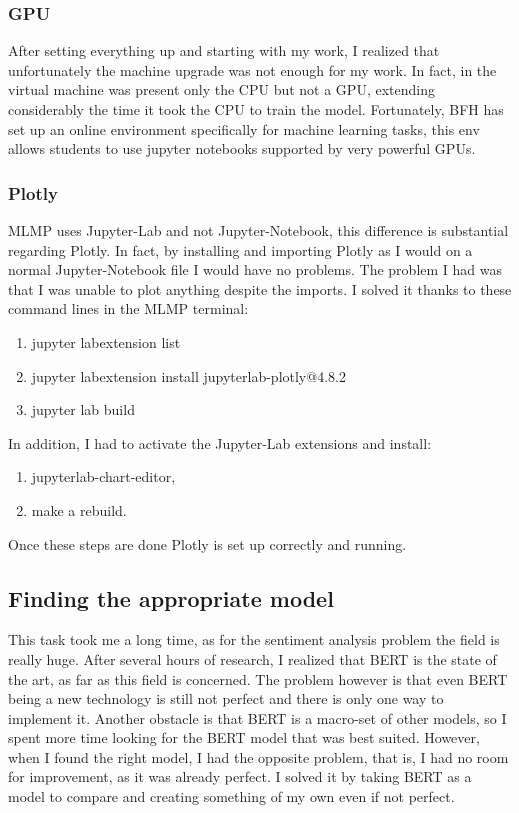\subsubsection{GPU}
After setting everything up and starting with my work, I realized that unfortunately the machine upgrade was not enough for my work.
In fact, in the virtual machine was present only the CPU but not a GPU, extending considerably the time it took the CPU to train the model.
Fortunately, BFH has set up an online environment specifically for machine learning tasks, this env allows students to use jupyter notebooks supported by very powerful GPUs.

\subsubsection{Plotly}
\gls{MLMP} uses Jupyter-Lab and not Jupyter-Notebook, this difference is substantial regarding \gls{Plotly}. In fact, by installing and importing \gls{Plotly} as I would on a normal Jupyter-Notebook file I would have no problems.
The problem I had was that I was unable to \gls{plot} anything despite the imports.
I solved it thanks to these command lines in the \gls{MLMP} terminal:
\begin{enumerate}
    \item jupyter labextension list
    \item jupyter labextension install jupyterlab-plotly@4.8.2
    \item jupyter lab build
\end{enumerate}

In addition, I had to activate the Jupyter-Lab extensions and install:
\begin{enumerate}
    \item jupyterlab-chart-editor,
    \item make a rebuild.
\end{enumerate}

Once these steps are done \gls{Plotly} is set up correctly and running.

\subsection{Finding the appropriate model}
This task took me a long time, as for the sentiment analysis problem the field is really huge.
After several hours of research, I realized that \gls{BERT} is the state of the art, as far as this field is concerned.
The problem however is that even \gls{BERT} being a new technology is still not perfect and there is only one way to implement it.
Another obstacle is that \gls{BERT} is a macro-set of other models, so I spent more time looking for the \gls{BERT} model that was best suited.
However, when I found the right model, I had the opposite problem, that is, I had no room for improvement, as it was already perfect. 
I solved it by taking \gls{BERT} as a model to compare and creating something of my own even if not perfect.

